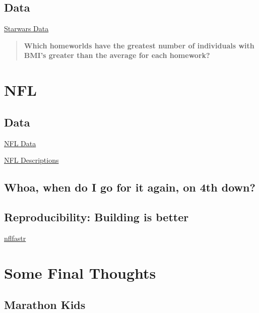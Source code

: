 \documentclass[
]{book}
\begin{document}
\hypertarget{data}{%
\section{Data}\label{data}}

\href{https://github.com/tidyverse/dplyr/tree/main/data-raw}{Starwars Data}

\begin{quote}
\textbf{Which homeworlds have the greatest number of individuals with BMI's greater than the average for each homework?}
\end{quote}

\hypertarget{nfl}{%
\chapter{NFL}\label{nfl}}

\hypertarget{data-1}{%
\section{Data}\label{data-1}}

\href{https://github.com/nflverse/nflverse-data/releases/tag/pbp}{NFL Data}

\href{https://www.nflfastr.com/articles/field_descriptions.html}{NFL Descriptions}

\hypertarget{whoa-when-do-i-go-for-it-again-on-4th-down}{%
\section{Whoa, when do I go for it again, on 4th down?}\label{whoa-when-do-i-go-for-it-again-on-4th-down}}

\hypertarget{reproducibility-building-is-better}{%
\section{Reproducibility: Building is better}\label{reproducibility-building-is-better}}

\href{https://www.nflfastr.com/}{nflfastr}

\hypertarget{some-final-thoughts}{%
\chapter{Some Final Thoughts}\label{some-final-thoughts}}

\hypertarget{marathon-kids-1}{%
\section{Marathon Kids}\label{marathon-kids-1}}
\end{document}
